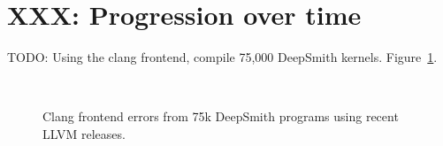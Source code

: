 \section{XXX: Progression over time}\label{sec:clangs}

TODO: Using the clang frontend, compile 75,000 DeepSmith kernels. Figure~\ref{fig:clangs}.

\begin{figure}
  \centering %
  \\%
  \caption{%
    Clang frontend errors from 75k DeepSmith programs using recent LLVM releases.%
  }%
  \label{fig:clangs} %
\end{figure}


